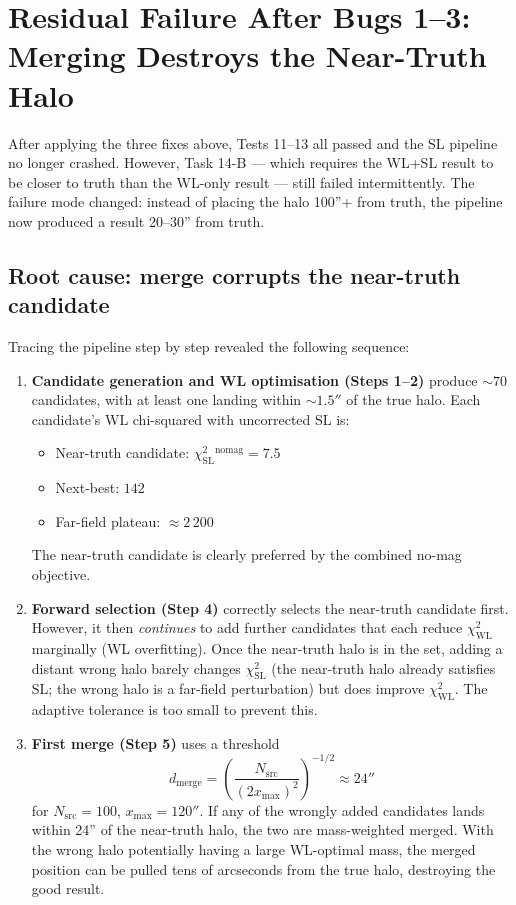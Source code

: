 \documentclass[12pt]{article}
\begin{document}
\section{Residual Failure After Bugs 1--3: Merging Destroys the Near-Truth Halo}
\label{sec:residual}

After applying the three fixes above, Tests 11--13 all passed and the SL pipeline no
longer crashed.  However, Task 14-B --- which requires the WL+SL result to be closer
to truth than the WL-only result --- still failed intermittently.  The failure mode
changed: instead of placing the halo 100''+ from truth, the pipeline now produced a
result 20--30'' from truth.

\subsection{Root cause: merge corrupts the near-truth candidate}

Tracing the pipeline step by step revealed the following sequence:

\begin{enumerate}
  \item \textbf{Candidate generation and WL optimisation (Steps 1--2)} produce $\sim 70$
        candidates, with at least one landing within $\sim 1.5''$ of the true halo.
        Each candidate's WL chi-squared with uncorrected SL is:
        \begin{itemize}[noitemsep]
          \item Near-truth candidate: $\chi^2_\mathrm{SL}^\mathrm{nomag} = 7.5$
          \item Next-best: $142$
          \item Far-field plateau: $\approx 2\,200$
        \end{itemize}
        The near-truth candidate is clearly preferred by the combined no-mag objective.
  \item \textbf{Forward selection (Step 4)} correctly selects the near-truth candidate
        first.  However, it then \emph{continues} to add further candidates that each
        reduce $\chi^2_\mathrm{WL}$ marginally (WL overfitting).  Once the near-truth
        halo is in the set, adding a distant wrong halo barely changes $\chi^2_\mathrm{SL}$
        (the near-truth halo already satisfies SL; the wrong halo is a far-field
        perturbation) but does improve $\chi^2_\mathrm{WL}$.  The adaptive tolerance
        is too small to prevent this.
  \item \textbf{First merge (Step 5)} uses a threshold
        \begin{equation}
          d_\mathrm{merge} = \left(\frac{N_\mathrm{src}}{(2x_\mathrm{max})^2}\right)^{-1/2}
          \approx 24''
        \end{equation}
        for $N_\mathrm{src}=100$, $x_\mathrm{max}=120''$.  If any of the wrongly added
        candidates lands within 24'' of the near-truth halo, the two are mass-weighted
        merged.  With the wrong halo potentially having a large WL-optimal mass, the
        merged position can be pulled tens of arcseconds from the true halo, destroying
        the good result.
\end{enumerate}
\end{document}
